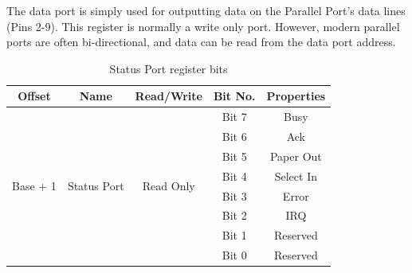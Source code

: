 \documentclass[a4paper,28pt]{report}
\begin{document}
The data port is simply used for outputting data on the Parallel Port's data lines (Pins 2-9). This register is normally a write only port. However, modern parallel ports are often bi-directional, and data can be read from the data port address.

\begin{table}[h]
\centering
\bgroup
\def\arraystretch{1.5}
\begin{tabular}{|c|c|c|c|c|}
\hline
\textbf{Offset}           & \textbf{Name}                & \textbf{Read/Write}        & \textbf{Bit No.} & \textbf{Properties} \\ \hline
\multirow{8}{*}{Base + 1} & \multirow{8}{*}{Status Port} & \multirow{8}{*}{Read Only} & Bit 7            & Busy                \\ \cline{4-5} 
                          &                              &                            & Bit 6            & Ack                 \\ \cline{4-5} 
                          &                              &                            & Bit 5            & Paper Out           \\ \cline{4-5} 
                          &                              &                            & Bit 4            & Select In           \\ \cline{4-5} 
                          &                              &                            & Bit 3            & Error               \\ \cline{4-5} 
                          &                              &                            & Bit 2            & IRQ                 \\ \cline{4-5} 
                          &                              &                            & Bit 1            & Reserved            \\ \cline{4-5} 
                          &                              &                            & Bit 0            & Reserved              \\ \hline
\end{tabular}
\caption{Status Port register bits}
\egroup
\end{table}
\end{document}

